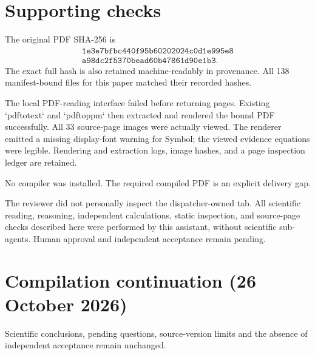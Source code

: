 \documentclass[10pt]{article}
\begin{document}
\section*{Supporting checks}
The original PDF SHA-256 is \[\begin{gathered}
\texttt{1e3e7bfbc440f95b60202024c0d1e995e8}\\
\texttt{a98dc2f5370bead60b47861d90e1b3}.
\end{gathered}\] The exact full hash is also retained machine-readably in provenance. All 138 manifest-bound files for this paper matched their recorded hashes.\par
The local PDF-reading interface failed before returning pages. Existing `pdftotext` and `pdftoppm` then extracted and rendered the bound PDF successfully. All 33 source-page images were actually viewed. The renderer emitted a missing display-font warning for Symbol; the viewed evidence equations were legible. Rendering and extraction logs, image hashes, and a page inspection ledger are retained.\par
No compiler was installed. The required compiled PDF is an explicit delivery gap.\par
The reviewer did not personally inspect the dispatcher-owned tab. All scientific reading, reasoning, independent calculations, static inspection, and source-page checks described here were performed by this assistant, without scientific sub-agents. Human approval and independent acceptance remain pending.\par
\section*{Compilation continuation (26 October 2026)}
Scientific conclusions, pending questions, source-version limits and the absence of independent acceptance remain unchanged.\par
\end{document}
